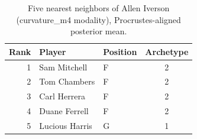 \begin{table}[htbp]
  \centering\small
  \begin{tabular}{rllc}
    \toprule
    Rank & Player & Position & Archetype \\
    \midrule
    1 & Sam Mitchell & F & 2 \\
    2 & Tom Chambers & F & 2 \\
    3 & Carl Herrera & F & 2 \\
    4 & Duane Ferrell & F & 2 \\
    5 & Lucious Harris & G & 1 \\
    \bottomrule
  \end{tabular}
  \caption{Five nearest neighbors of Allen Iverson (curvature_m4 modality), Procrustes-aligned posterior mean.}
  \label{tab:Allen_Iverson_neighbors_curvature_m4}
\end{table}

